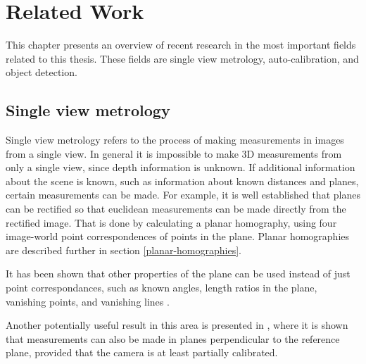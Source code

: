 \chapter{Related Work}
%
%
%
%
% 
%
%
%
This chapter presents an overview of recent research in the most important fields related to this thesis.
These fields are single view metrology, auto-calibration, and object detection.

\section{Single view metrology} %
Single view metrology refers to the process of making measurements in images from a single view.
In general it is impossible to make 3D measurements from only a single view, since depth information is unknown.
If additional information about the scene is known, such as information about known distances and planes, certain measurements can be made.
For example, it is well established that planes can be rectified so that euclidean measurements can be made directly from the rectified image.
That is done by calculating a planar homography, using four image-world point correspondences of points in the plane.
Planar homographies are described further in section \ref{planar-homographies}.

It has been shown that other properties of the plane can be used instead of just point correspondances, such as known angles, length ratios in the plane, vanishing points, and vanishing lines \cite{liebowitz1998metric} \cite{criminisi2000single}.

Another potentially useful result in this area is presented in \cite{huang2004new}, where it is shown that measurements can also be made in planes perpendicular to the reference plane, provided that the camera is at least partially calibrated.

